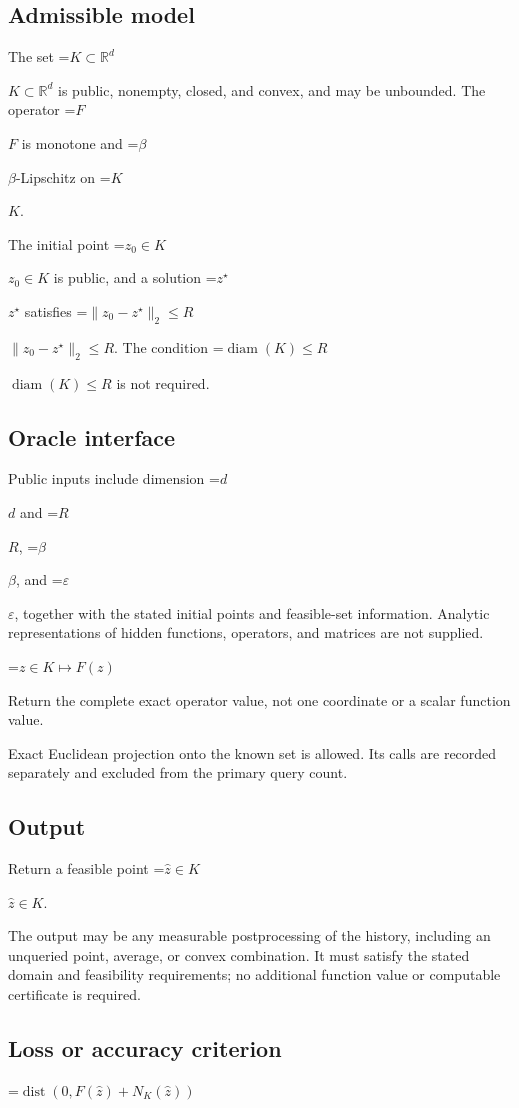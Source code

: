 \documentclass[10pt,a4paper]{article}
\newcommand{\AtlasMath}[1]{\par\begingroup\centering\setbox0=\hbox{$\displaystyle #1$}\ifdim\wd0>1.4\linewidth\typeout{ATLAS WIDE FORMULA: \the\wd0}\fi\ifdim\wd0>\linewidth\resizebox{\linewidth}{!}{\box0}\else\box0\fi\par\endgroup}
\newcommand{\AtlasInlineMath}[1]{\begingroup\setbox0=\hbox{$#1$}\ifdim\wd0>.4\linewidth\endgroup\AtlasMath{#1}\else\endgroup$#1$\fi}
\begin{document}
\subsection{Admissible model}
The set \AtlasInlineMath{K\subset\mathbb R^d} is public, nonempty, closed, and convex, and may be unbounded. The operator \AtlasInlineMath{F} is monotone and \AtlasInlineMath{\beta}-Lipschitz on \AtlasInlineMath{K}.

The initial point \AtlasInlineMath{z_0\in K} is public, and a solution \AtlasInlineMath{z^\star} satisfies \AtlasInlineMath{\|z_0-z^\star\|_2\le R}. The condition \AtlasInlineMath{\operatorname{diam}(K)\le R} is not required.

\subsection{Oracle interface}
Public inputs include dimension \AtlasInlineMath{d} and \AtlasInlineMath{R}, \AtlasInlineMath{\beta}, and \AtlasInlineMath{\varepsilon}, together with the stated initial points and feasible-set information. Analytic representations of hidden functions, operators, and matrices are not supplied.


\AtlasMath{z\in K\longmapsto F(z)}


Return the complete exact operator value, not one coordinate or a scalar function value.

Exact Euclidean projection onto the known set is allowed. Its calls are recorded separately and excluded from the primary query count.

\subsection{Output}
Return a feasible point \AtlasInlineMath{\widehat z\in K}.

The output may be any measurable postprocessing of the history, including an unqueried point, average, or convex combination. It must satisfy the stated domain and feasibility requirements; no additional function value or computable certificate is required.

\subsection{Loss or accuracy criterion}

\AtlasMath{\operatorname{dist}(0,F(\widehat{z})+N_K(\widehat{z}))}
\end{document}
